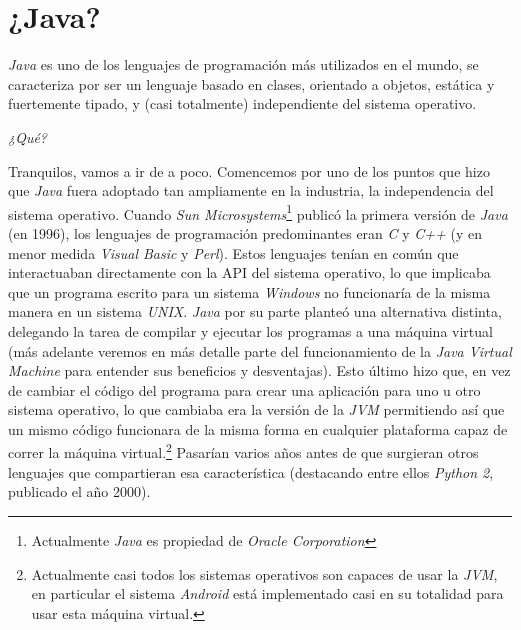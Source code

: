 \section{¿Java?}
  \textit{Java} es uno de los lenguajes de programación más utilizados en el mundo, se 
  caracteriza por ser un lenguaje basado en clases, orientado a objetos, estática y fuertemente 
  tipado, y (casi totalmente) independiente del sistema operativo.
  
  \begin{center}
    \textit{¿Qué?}
  \end{center}

  Tranquilos, vamos a ir de a poco.
  Comencemos por uno de los puntos que hizo que \textit{Java} fuera adoptado tan ampliamente en la
  industria, la independencia del sistema operativo.
  Cuando \textit{Sun Microsystems}\footnote{Actualmente \textit{Java} es propiedad de 
  \textit{Oracle Corporation}} publicó la primera versión de \textit{Java} (en 1996), los 
  lenguajes de programación predominantes eran \textit{C} y \textit{C++} (y en menor medida 
  \textit{Visual Basic} y \textit{Perl}).\autocite{MostPopularProgramming}
  Estos lenguajes tenían en común que interactuaban directamente con la API del sistema operativo,
  lo que implicaba que un programa escrito para un sistema \textit{Windows} no funcionaría de la
  misma manera en un sistema \textit{UNIX}.
  \textit{Java} por su parte planteó una alternativa distinta, delegando la tarea de compilar y 
  ejecutar los programas a una máquina virtual (más adelante veremos en más detalle parte del 
  funcionamiento de la \textit{Java Virtual Machine} para entender sus 
  beneficios y desventajas).
  Esto último hizo que, en vez de cambiar el código del programa para crear una aplicación para 
  uno u otro sistema operativo, lo que cambiaba era la versión de la \textit{JVM} permitiendo así
  que un mismo código funcionara de la misma forma en cualquier plataforma capaz de correr la 
  máquina virtual.\footnote{Actualmente casi todos los sistemas operativos son capaces de usar la 
  \textit{JVM}, en particular el sistema \textit{Android} está implementado casi en su totalidad 
  para usar esta máquina virtual.}
  Pasarían varios años antes de que surgieran otros lenguajes que compartieran esa característica
  (destacando entre ellos \textit{Python 2}, publicado el año 2000).




